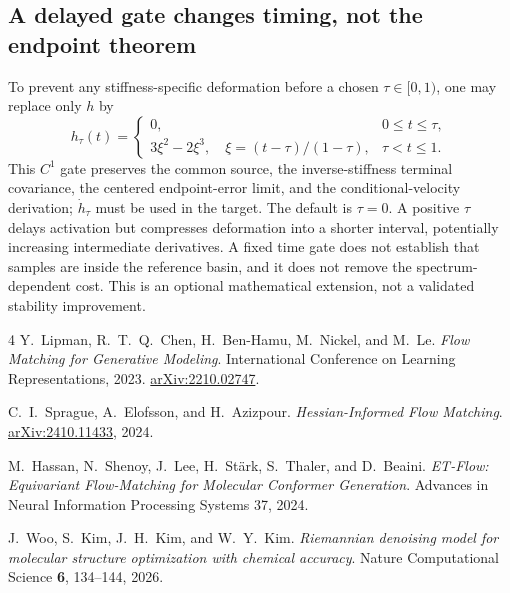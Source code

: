 \documentclass[11pt,letterpaper]{article}
\begin{document}
\subsection{A delayed gate changes timing, not the endpoint theorem}
To prevent any stiffness-specific deformation before a chosen $\tau\in[0,1)$, one may replace only $h$ by
\begin{equation}\label{eq:delay}
h_\tau(t)=
\begin{cases}
0,&0\le t\le\tau,\\
3\xi^2-2\xi^3,\quad \xi=(t-\tau)/(1-\tau),&\tau<t\le1.
\end{cases}
\end{equation}
This $C^1$ gate preserves the common source, the inverse-stiffness terminal covariance, the centered endpoint-error limit, and the conditional-velocity derivation; $\dot h_\tau$ must be used in the target. The default is $\tau=0$. A positive $\tau$ delays activation but compresses deformation into a shorter interval, potentially increasing intermediate derivatives. A fixed time gate does not establish that samples are inside the reference basin, and it does not remove the spectrum-dependent cost. This is an optional mathematical extension, not a validated stability improvement.

\begin{thebibliography}{4}
Y.~Lipman, R.~T.~Q.~Chen, H.~Ben-Hamu, M.~Nickel, and M.~Le.
\emph{Flow Matching for Generative Modeling}.
International Conference on Learning Representations, 2023.
\href{https://arxiv.org/abs/2210.02747}{arXiv:2210.02747}.

C.~I.~Sprague, A.~Elofsson, and H.~Azizpour.
\emph{Hessian-Informed Flow Matching}.
\href{https://arxiv.org/abs/2410.11433}{arXiv:2410.11433}, 2024.

M.~Hassan, N.~Shenoy, J.~Lee, H.~St\"ark, S.~Thaler, and D.~Beaini.
\emph{ET-Flow: Equivariant Flow-Matching for Molecular Conformer Generation}.
Advances in Neural Information Processing Systems 37, 2024.

J.~Woo, S.~Kim, J.~H.~Kim, and W.~Y.~Kim.
\emph{Riemannian denoising model for molecular structure optimization with chemical accuracy}.
Nature Computational Science \textbf{6}, 134--144, 2026.
\end{thebibliography}
\end{document}
